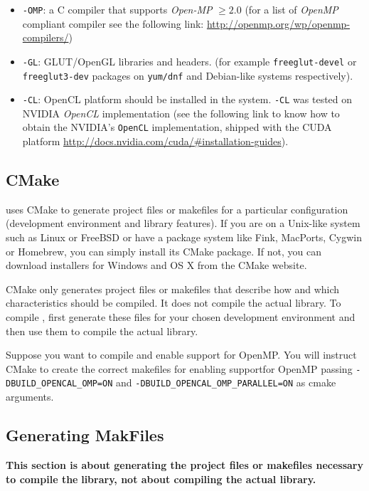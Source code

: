 \begin{itemize}
	\item \texttt{\ocal-OMP}: a C compiler that supports \emph{Open-MP} $\geq 2.0$ (for a list of \emph{OpenMP} compliant compiler see the following link: \url{http://openmp.org/wp/openmp-compilers/})
	\item  \texttt{\ocal-GL}: GLUT/OpenGL libraries and headers. (for example \texttt{freeglut-devel} or \texttt{freeglut3-dev} packages on \texttt{yum/dnf} and Debian-like systems respectively).
	\item \texttt{\ocal-CL}: OpenCL platform should be installed in the system. \texttt{\ocal-CL} was tested on NVIDIA  \emph{OpenCL} implementation (see the following link to know how to obtain the NVIDIA's \texttt{OpenCL} implementation, shipped with the CUDA platform \url{http://docs.nvidia.com/cuda/#installation-guides}).
\end{itemize}



\subsection{CMake}
\texttt{\ocal} uses CMake to generate project files or makefiles for a particular configuration (development environment and library features). If you are on a Unix-like system such as Linux or FreeBSD or have a package system like Fink, MacPorts, Cygwin or Homebrew, you can simply install its CMake package. If not, you can download installers for Windows and OS X from the CMake website.

CMake only generates project files or makefiles that describe how and which characteristics should be compiled. It does not compile the actual \ocal library. To compile \ocal, first generate these files for your chosen development environment and then use them to compile the actual \texttt{\ocal} library.

Suppose you want to compile \texttt{\ocal} and enable support for OpenMP. You will instruct CMake to create the correct makefiles for enabling supportfor OpenMP passing \texttt{-DBUILD\_OPENCAL\_OMP=ON} and \texttt{-DBUILD\_OPENCAL\_OMP\_PARALLEL=ON} as cmake arguments. 

\subsection{Generating MakFiles}
\textbf{This section is about generating the project files or makefiles necessary to compile the}  \texttt{\ocal} \textbf{library, not about compiling the actual library.}

